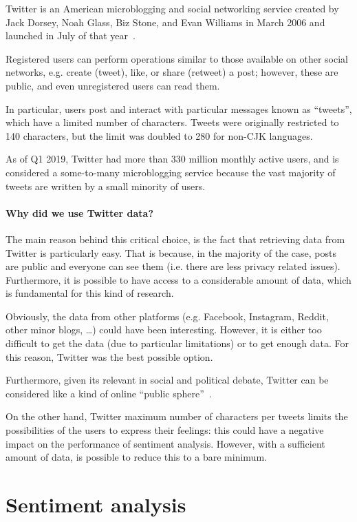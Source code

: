 Twitter is an American microblogging and social networking service created by Jack Dorsey, Noah Glass, Biz Stone, and Evan Williams in March 2006 and launched in July of that year~\cite{enwiki:1027840990}.

Registered users can perform operations similar to those available on other social networks, e.g. create (tweet), like, or share (retweet) a post; however, these are public, and even unregistered users can read them. 

In particular, users post and interact with particular messages known as “tweets”, which have a limited number of characters. Tweets were originally restricted to 140 characters, but the limit was doubled to 280 for non-CJK languages.

As of Q1 2019, Twitter had more than 330 million monthly active users, and is considered a some-to-many microblogging service because the vast majority of tweets are written by a small minority of users.

\paragraph{Why did we use Twitter data?}

The main reason behind this critical choice, is the fact that retrieving data from Twitter is particularly easy. That is because, in the majority of the case, posts are public and everyone can see them (i.e. there are less privacy related issues). Furthermore, it is possible to have access to a considerable amount of data, which is fundamental for this kind of research. 

Obviously, the data from other platforms (e.g. Facebook, Instagram, Reddit, other minor blogs, \ldots) could have been interesting. However, it is either too difficult to get the data (due to particular limitations) or to get enough data. For this reason, Twitter was the best possible option.

Furthermore, given its relevant in social and political debate, Twitter can be considered like a kind of online “public sphere”~\cite{doi:10.1080/1369118X.2012.756050}.

On the other hand, Twitter maximum number of characters per tweets limits the possibilities of the users to express their feelings: this could have a negative impact on the performance of sentiment analysis. However, with a sufficient amount of data, is possible to reduce this to a bare minimum. 

\section{Sentiment analysis}
\label{sec:sentiment-analysis}

